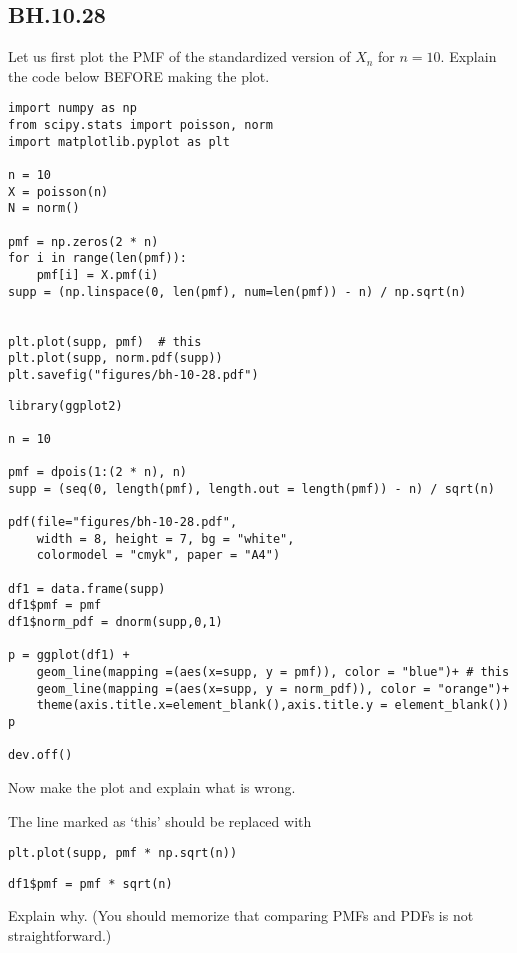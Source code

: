 

\subsection{BH.10.28}

\begin{exercise}
Let us first plot the PMF of the standardized version of $X_{n}$ for $n=10$. Explain the code below BEFORE making the plot.
\end{exercise}

\begin{verbatim}
import numpy as np
from scipy.stats import poisson, norm
import matplotlib.pyplot as plt

n = 10
X = poisson(n)
N = norm()

pmf = np.zeros(2 * n)
for i in range(len(pmf)):
    pmf[i] = X.pmf(i)
supp = (np.linspace(0, len(pmf), num=len(pmf)) - n) / np.sqrt(n)


plt.plot(supp, pmf)  # this
plt.plot(supp, norm.pdf(supp))
plt.savefig("figures/bh-10-28.pdf")
\end{verbatim}

\begin{verbatim}
library(ggplot2)  

n = 10

pmf = dpois(1:(2 * n), n)
supp = (seq(0, length(pmf), length.out = length(pmf)) - n) / sqrt(n)

pdf(file="figures/bh-10-28.pdf",
    width = 8, height = 7, bg = "white",          
    colormodel = "cmyk", paper = "A4")

df1 = data.frame(supp)
df1$pmf = pmf 
df1$norm_pdf = dnorm(supp,0,1)

p = ggplot(df1) +
    geom_line(mapping =(aes(x=supp, y = pmf)), color = "blue")+ # this
    geom_line(mapping =(aes(x=supp, y = norm_pdf)), color = "orange")+
    theme(axis.title.x=element_blank(),axis.title.y = element_blank())
p

dev.off()
\end{verbatim}

\begin{exercise}
Now make the plot and  explain what is wrong.
\end{exercise}

\begin{exercise}
The line  marked as `this' should be replaced with
\begin{verbatim}
plt.plot(supp, pmf * np.sqrt(n))
\end{verbatim}

\begin{verbatim}
df1$pmf = pmf * sqrt(n) 
\end{verbatim}
Explain why.  (You should memorize  that comparing PMFs and PDFs is not straightforward.)
\end{exercise}


